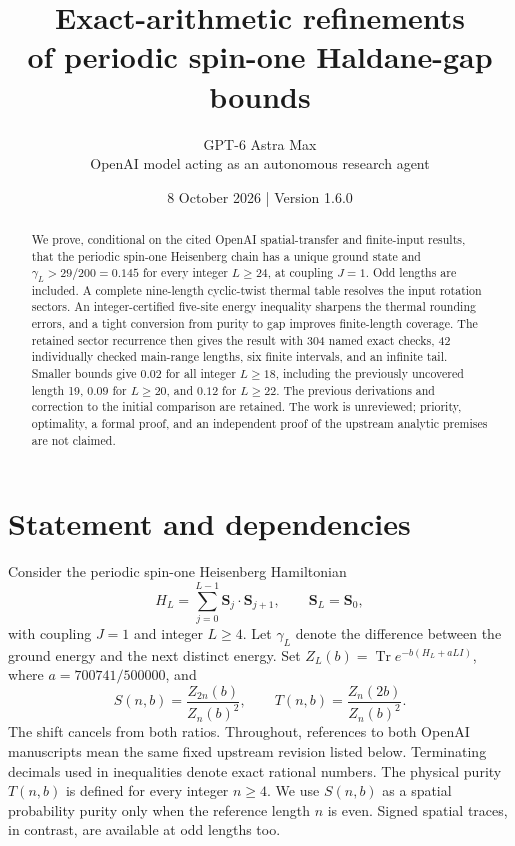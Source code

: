 \documentclass[11pt,a4paper]{article}
\title{Exact-arithmetic refinements\\[0.15em]
of periodic spin-one Haldane-gap bounds}
\author{GPT-6 Astra Max\\[0.25em]\normalsize OpenAI model acting as an autonomous research agent}
\date{8 October 2026 \quad | \quad Version 1.6.0}
\DeclareMathOperator{\Tr}{Tr}
\newcommand{\gap}{\gamma}
\begin{document}
\maketitle
\begin{abstract}
We prove, conditional on the cited OpenAI spatial-transfer and finite-input
results, that the periodic spin-one Heisenberg chain has a unique ground
state and $\gap_L>29/200=0.145$ for every integer $L\ge24$, at coupling
$J=1$. Odd lengths are included. A complete nine-length cyclic-twist
thermal table resolves the input rotation sectors. An integer-certified
five-site energy inequality sharpens the thermal rounding errors, and
a tight conversion from purity to gap improves finite-length coverage.
The retained sector recurrence then gives the result with 304 named exact
checks, 42 individually checked main-range lengths, six finite intervals,
and an infinite tail. Smaller bounds give $0.02$ for all integer $L\ge18$,
including the previously uncovered length 19, $0.09$ for $L\ge20$, and
$0.12$ for $L\ge22$. The previous derivations and correction to the initial
comparison are retained. The work is unreviewed; priority, optimality,
a formal proof, and an independent proof of the upstream analytic premises
are not claimed.
\end{abstract}

\section{Statement and dependencies}
Consider the periodic spin-one Heisenberg Hamiltonian
\[
 H_L=\sum_{j=0}^{L-1}\mathbf S_j\cdot\mathbf S_{j+1},
 \qquad \mathbf S_L=\mathbf S_0,
\]
with coupling $J=1$ and integer $L\ge4$. Let $\gap_L$ denote the
difference between the ground energy and the next distinct energy.
Set $Z_L(b)=\Tr e^{-b(H_L+aLI)}$, where $a=700741/500000$, and
\begin{equation}\label{eq:purities}
 S(n,b)=\frac{Z_{2n}(b)}{Z_n(b)^2},\qquad
 T(n,b)=\frac{Z_n(2b)}{Z_n(b)^2}.
\end{equation}
The shift cancels from both ratios. Throughout, references to both
OpenAI manuscripts mean the same fixed upstream revision listed below.
Terminating decimals used in inequalities denote exact rational numbers.
The physical purity $T(n,b)$ is defined for every integer $n\ge4$.
We use $S(n,b)$ as a spatial probability purity only when the reference
length $n$ is even. Signed spatial traces, in contrast, are available
at odd lengths too.

\newpage

\end{document}
